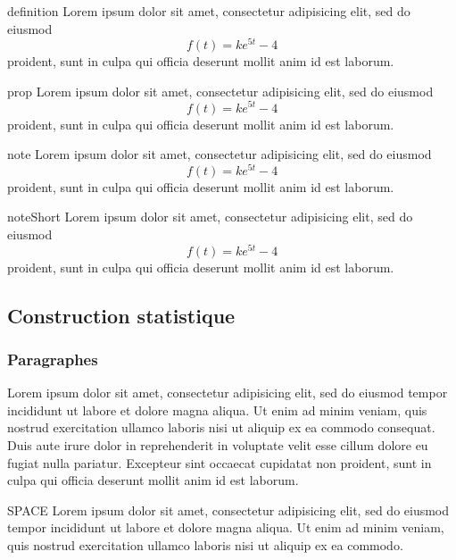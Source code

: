 		\begin{definition}
			definition
			Lorem ipsum dolor sit amet, consectetur adipisicing elit, sed do eiusmod
			$$
				f(t) = ke^{5t} - 4
			$$
			proident, sunt in culpa qui officia deserunt mollit anim id est laborum.
		\end{definition}

		\begin{prop}
			prop
			Lorem ipsum dolor sit amet, consectetur adipisicing elit, sed do eiusmod
			$$
				f(t) = ke^{5t} - 4
			$$
			proident, sunt in culpa qui officia deserunt mollit anim id est laborum.
		\end{prop}

		\begin{note}
			note
			Lorem ipsum dolor sit amet, consectetur adipisicing elit, sed do eiusmod
			$$
				f(t) = ke^{5t} - 4
			$$
			proident, sunt in culpa qui officia deserunt mollit anim id est laborum.
		\end{note}

		\begin{noteShort}
			noteShort
			Lorem ipsum dolor sit amet, consectetur adipisicing elit, sed do eiusmod
			$$
				f(t) = ke^{5t} - 4
			$$
			proident, sunt in culpa qui officia deserunt mollit anim id est laborum.
		\end{noteShort}

	\subsection{Construction statistique}

		\subsubsection{Paragraphes}

			Lorem ipsum dolor sit amet, consectetur adipisicing elit, sed do eiusmod
			tempor incididunt ut labore et dolore magna aliqua. Ut enim ad minim veniam,
			quis nostrud exercitation ullamco laboris nisi ut aliquip ex ea commodo
			consequat. Duis aute irure dolor in reprehenderit in voluptate velit esse
			cillum dolore eu fugiat nulla pariatur. Excepteur sint occaecat cupidatat non
			proident, sunt in culpa qui officia deserunt mollit anim id est laborum.

			SPACE Lorem ipsum dolor sit amet, consectetur adipisicing elit, sed do eiusmod
			tempor incididunt ut labore et dolore magna aliqua. Ut enim ad minim veniam,
			quis nostrud exercitation ullamco laboris nisi ut aliquip ex ea commodo.

